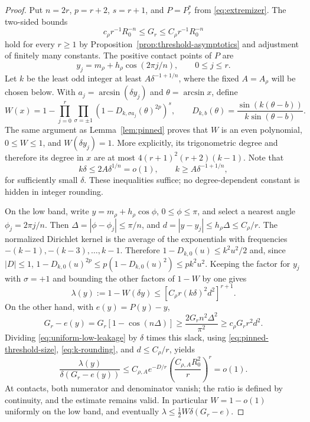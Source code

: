\begin{proof}
Put $n=2r$, $p=r+2$, $s=r+1$, and $P=P_r^*$ from \eqref{eq:extremizer}. The two-sided bounds
\begin{equation}\label{eq:pinned-threshold-size}
 c_\rho r^{-1}R_0^{-n}\leq G_r\leq C_\rho r^{-1}R_0^{-n}
\end{equation}
hold for every $r\geq1$ by Proposition~\ref{prop:threshold-asymptotics} and adjustment of finitely many constants. The positive contact points of $P$ are
\[
 y_j=m_\rho+h_\rho\cos(2\pi j/n),\qquad 0\leq j\leq r.
\]
Let $k$ be the least odd integer at least $A\delta^{-1+1/n}$, where the fixed $A=A_\rho$ will be chosen below. With $a_j=\arcsin(\delta y_j)$ and $\theta=\arcsin x$, define
\begin{equation}\label{eq:uniform-pinned-gate}
 W(x)=1-\prod_{j=0}^r\prod_{\sigma=\pm1}
 \left(1-D_{k,\sigma a_j}(\theta)^{2p}\right)^s,
 \qquad
 D_{k,b}(\theta)=\frac{\sin(k(\theta-b))}{k\sin(\theta-b)}.
\end{equation}
The same argument as Lemma~\ref{lem:pinned} proves that $W$ is an even polynomial, $0\leq W\leq1$, and $W(\delta y_j)=1$. More explicitly, its trigonometric degree and therefore its degree in $x$ are at most
$4(r+1)^2(r+2)(k-1)$.
Note that
\begin{equation}\label{eq:k-rounding}
 k\delta\leq2A\delta^{1/n}=o(1),\qquad
 k\geq A\delta^{-1+1/n},
\end{equation}
for sufficiently small $\delta$. These inequalities suffice; no degree-dependent constant is hidden in integer rounding.

On the low band, write $y=m_\rho+h_\rho\cos\phi$, $0\leq\phi\leq\pi$, and select a nearest angle $\phi_j=2\pi j/n$. Then $\Delta=|\phi-\phi_j|\leq\pi/n$, and $d=|y-y_j|\leq h_\rho\Delta\leq C_\rho/r$. The normalized Dirichlet kernel is the average of the exponentials with frequencies $-(k-1),-(k-3),\ldots,k-1$. Therefore $1-D_{k,0}(u)\leq k^2u^2/2$ and, since $|D|\leq1$,
$1-D_{k,0}(u)^{2p}\leq p(1-D_{k,0}(u)^2)\leq p k^2u^2$.
Keeping the factor for $y_j$ with $\sigma=+1$ and bounding the other factors of $1-W$ by one gives
\begin{equation}\label{eq:uniform-low-leakage}
 \lambda(y):=1-W(\delta y)
 \leq[C_\rho r(k\delta)^2d^2]^{r+1}.
\end{equation}
On the other hand, with $e(y)=P(y)-y$,
\begin{equation}\label{eq:uniform-contact-slack}
 G_r-e(y)=G_r[1-\cos(n\Delta)]
 \geq\frac{2G_rn^2\Delta^2}{\pi^2}
 \geq c_\rho G_rr^2d^2.
\end{equation}
Dividing \eqref{eq:uniform-low-leakage} by $\delta$ times this slack, using \eqref{eq:pinned-threshold-size}, \eqref{eq:k-rounding}, and $d\leq C_\rho/r$, yields
\begin{equation}\label{eq:uniform-slack-ratio}
 \frac{\lambda(y)}{\delta(G_r-e(y))}
 \leq C_{\rho,A}e^{-D/r}
          \left(\frac{C_{\rho,A}R_0^2}{r}\right)^r=o(1).
\end{equation}
At contacts, both numerator and denominator vanish; the ratio is defined by continuity, and the estimate remains valid. In particular $W=1-o(1)$ uniformly on the low band, and eventually
$\lambda\leq\tfrac12W\delta(G_r-e)$.


\end{proof}
